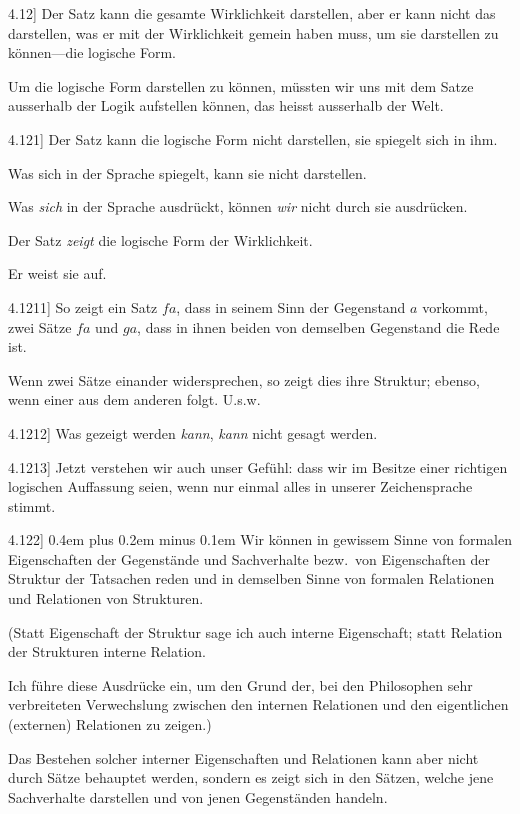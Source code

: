 \documentclass[12pt,oneside]{book}[2007/10/19]
\newcommand{\PropERef}[1]{\hyperref[PropE:#1]{#1}}
\newcommand{\PropositionG}[2]{%
  \item[\phantomsection\label{PropG:#1}\PropERef{#1}] #2%
}
\newcommand{\Emph}[1]{\emph{#1}}%
\newcommand{\stretchyspace}{\spaceskip0.4em plus 0.2em minus 0.1em}
\begin{document}
\begin{propositions}
\PropositionG{4.12}
{Der Satz kann die gesamte Wirklichkeit darstellen,
aber er kann nicht das darstellen, was er
mit der Wirklichkeit gemein haben muss, um sie
darstellen zu können---die logische Form.

Um die logische Form darstellen zu können,
müssten wir uns mit dem Satze ausserhalb der
Logik aufstellen können, das heisst ausserhalb der
Welt.}


\PropositionG{4.121}
{Der Satz kann die logische Form nicht darstellen,
sie spiegelt sich in ihm.

Was sich in der Sprache spiegelt, kann sie
nicht darstellen.

Was \Emph{sich} in der Sprache ausdrückt, können
\Emph{wir} nicht durch sie ausdrücken.

Der Satz \Emph{zeigt} die logische Form der Wirklichkeit.

Er weist sie auf.}


\PropositionG{4.1211}
{So zeigt ein Satz \glqq{}$fa$\grqq{}, dass in seinem Sinn der
Gegenstand $a$ vorkommt, zwei Sätze \glqq{}$fa$\grqq{} und \glqq{}$ga$\grqq{},
dass in ihnen beiden von demselben Gegenstand
die Rede ist.

Wenn zwei Sätze einander widersprechen, so
zeigt dies ihre Struktur; ebenso, wenn einer aus
dem anderen folgt. U.s.w.}


\PropositionG{4.1212}
{Was gezeigt werden \Emph{kann}, \Emph{kann} nicht gesagt
werden.}


\PropositionG{4.1213}
{Jetzt verstehen wir auch unser Gefühl: dass wir
im Besitze einer richtigen logischen Auffassung
seien, wenn nur einmal alles in unserer Zeichensprache
stimmt.}


\PropositionG{4.122}
{{\stretchyspace
Wir können in gewissem Sinne von formalen
Eigenschaften der Gegenstände und Sachverhalte
bezw.\ von Eigenschaften der Struktur der Tatsachen
reden und in demselben Sinne von formalen
Relationen und Relationen von Strukturen.}

(Statt Eigenschaft der Struktur sage ich auch
\glqq{}interne Eigenschaft\grqq{}; statt Relation der Strukturen
\glqq{}interne Relation\grqq{}.

Ich führe diese Ausdrücke ein, um den Grund
der, bei den Philosophen sehr verbreiteten Verwechslung
zwischen den internen Relationen und
den eigentlichen (externen) Relationen zu zeigen.)

Das Bestehen solcher interner Eigenschaften
und Relationen kann aber nicht durch Sätze
behauptet werden, sondern es zeigt sich in den
Sätzen, welche jene Sachverhalte darstellen und
von jenen Gegenständen handeln.}



\end{propositions}
\end{document}
